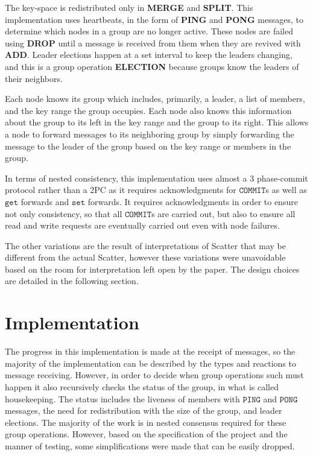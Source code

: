 \documentclass{amsart}
\theoremstyle{definition}
\theoremstyle{remark}
\numberwithin{equation}{section}
\begin{document}
The key-space is redistributed only in \textbf{MERGE} and \textbf{SPLIT}. This implementation uses heartbeats, in the form of \textbf{PING} and \textbf{PONG} messages, to determine which nodes in a group are no longer active. These nodes are failed using \textbf{DROP} until a message is received from them when they are revived with \textbf{ADD}. Leader elections happen at a set interval to keep the leaders changing, and this is a group operation \textbf{ELECTION} because groups know the leaders of their neighbors.

Each node knows its group which includes, primarily, a leader, a list of members, and the key range the group occupies. Each node also knows this information about the group to its left in the key range and the group to its right. This allows a node to forward messages to its neighboring group by simply forwarding the message to the leader of the group based on the key range or members in the group. 

In terms of nested consistency, this implementation uses almost a $3$ phase-commit protocol rather than a 2PC as it requires acknowledgments for $\mathtt{COMMIT}$s as well as $\mathtt{get}$ forwards and $\mathtt{set}$ forwards. It requires acknowledgments in order to ensure not only consistency, so that all $\mathtt{COMMIT}$s are carried out, but also to ensure all read and write requests are eventually carried out even with node failures. 

The other variations are the result of interpretations of Scatter that may be different from the actual Scatter, however these variations were unavoidable based on the room for interpretation left open by the paper. The design choices are detailed in the following section.
\section{Implementation}
The progress in this implementation is made at the receipt of messages, so the majority of the implementation can be described by the types and reactions to message receiving. However, in order to decide when group operations such must happen it also recursively checks the status of the group, in what is called housekeeping. The status includes the liveness of members with $\mathtt{PING}$ and $\mathtt{PONG}$ messages, the need for redistribution with the size of the group, and leader elections. The majority of the work is in nested consensus required for these group operations. However, based on the specification of the project and the manner of testing, some simplifications were made that can be easily dropped. 
\end{document}

